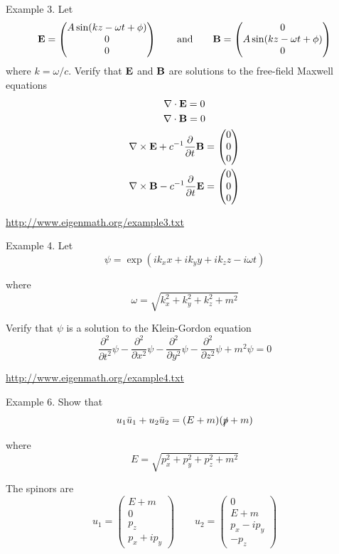\documentclass[12pt]{article}
\begin{document}
\bigskip
\noindent
Example 3. Let
$$
{\bf E}=
\begin{pmatrix}
A\sin(kz-\omega t+\phi)\\0\\0
\end{pmatrix}
\qquad\text{and}\qquad
{\bf B}=
\begin{pmatrix}
0\\A\sin(kz-\omega t+\phi)\\0
\end{pmatrix}
$$
where $k=\omega/c$.
Verify that $\bf E$ and $\bf B$ are solutions to the free-field Maxwell equations
\begin{gather*}
\nabla\cdot{\bf E}=0\\
\nabla\cdot{\bf B}=0\\
\nabla\times{\bf E}+c^{-1}\frac{\partial}{\partial t}{\bf B}=\begin{pmatrix}0\\0\\0\end{pmatrix}\\
\nabla\times{\bf B}-c^{-1}\frac{\partial}{\partial t}{\bf E}=\begin{pmatrix}0\\0\\0\end{pmatrix}
\end{gather*}



\noindent
\url{http://www.eigenmath.org/example3.txt}

\newpage
\noindent
Example 4. Let
$$
\psi=\exp(ik_xx+ik_yy+ik_zz-i\omega t)
$$

\noindent
where
$$
\omega=\sqrt{k_x^2+k_y^2+k_z^2+m^2}
$$

\noindent
Verify that $\psi$ is a solution to the Klein-Gordon equation
$$
\frac{\partial^2}{\partial t^2}\psi
-\frac{\partial^2}{\partial x^2}\psi
-\frac{\partial^2}{\partial y^2}\psi
-\frac{\partial^2}{\partial z^2}\psi
+m^2\psi=0
$$



\noindent
\url{http://www.eigenmath.org/example4.txt}

\newpage
\noindent
Example 6. Show that
$$
u_1\bar{u}_1+u_2\bar{u}_2=(E+m)(\slashed{p}+m)
$$

\noindent
where
$$
E=\sqrt{p_x^2+p_y^2+p_z^2+m^2}
$$

\noindent
The spinors are
$$
u_1=\begin{pmatrix}E+m\\0\\p_z\\p_x+ip_y\end{pmatrix}
\qquad
u_2=\begin{pmatrix}0\\E+m\\p_x-ip_y\\-p_z\end{pmatrix}
$$
\end{document}
